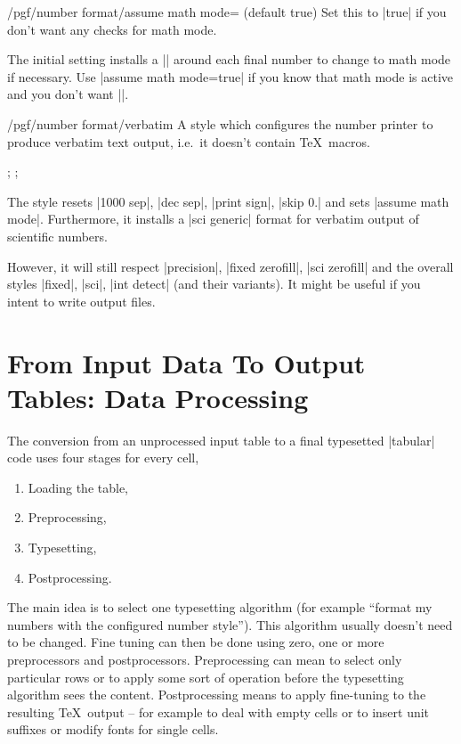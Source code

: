 \begin{key}{/pgf/number format/assume math mode= (default true)}
	Set this to |true| if you don't want any checks for math mode.
	
	The initial setting installs a |\pgfutilensuremath| around each final number to change to math mode if necessary. Use |assume math mode=true| if you know that math mode is active and you don't want |\pgfutilensuremath|.
\end{key}

\begin{stylekey}{/pgf/number format/verbatim}
	A style which configures the number printer to produce verbatim text output, i.e.\ it doesn't contain \TeX\ macros.
\begin{codeexample}[]
;
;
\pgfmathprintnumber{\pgfmathresult}
\end{codeexample}
	The style resets |1000 sep|, |dec sep|, |print sign|, |skip 0.| and sets |assume math mode|. Furthermore, it installs a |sci generic| format for verbatim output of scientific numbers.

	However, it will still respect |precision|, |fixed zerofill|, |sci zerofill| and the overall styles |fixed|, |sci|, |int detect| (and their variants). It might be useful if you intent to write output files.
\end{stylekey}




\section{From Input Data To Output Tables: Data Processing}
The conversion from an unprocessed input table to a final typesetted |tabular| code uses four stages for every cell,
\begin{enumerate}
	\item Loading the table,
	\item Preprocessing,
	\item Typesetting,
	\item Postprocessing.
\end{enumerate}
The main idea is to select one typesetting algorithm (for example ``format my numbers with the configured number style''). This algorithm usually doesn't need to be changed. Fine tuning can then be done using zero, one or more preprocessors and postprocessors. Preprocessing can mean to select only particular rows or to apply some sort of operation before the typesetting algorithm sees the content. Postprocessing means to apply fine-tuning to the resulting \TeX\ output -- for example to deal with empty cells or to insert unit suffixes or modify fonts for single cells.


